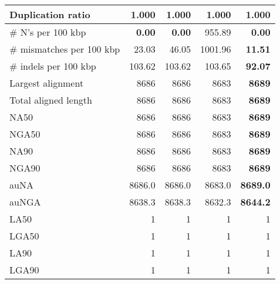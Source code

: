 \documentclass[12pt,a4paper]{article}
\begin{document}
\begin{table}[ht]
\begin{center}
\begin{tabular}{|l*{4}{|r}|}
Duplication ratio & 1.000 & 1.000 & 1.000 & 1.000 \\ \hline
\# N's per 100 kbp & {\bf 0.00} & {\bf 0.00} & 955.89 & {\bf 0.00} \\ \hline
\# mismatches per 100 kbp & 23.03 & 46.05 & 1001.96 & {\bf 11.51} \\ \hline
\# indels per 100 kbp & 103.62 & 103.62 & 103.65 & {\bf 92.07} \\ \hline
Largest alignment & 8686 & 8686 & 8683 & {\bf 8689} \\ \hline
Total aligned length & 8686 & 8686 & 8683 & {\bf 8689} \\ \hline
NA50 & 8686 & 8686 & 8683 & {\bf 8689} \\ \hline
NGA50 & 8686 & 8686 & 8683 & {\bf 8689} \\ \hline
NA90 & 8686 & 8686 & 8683 & {\bf 8689} \\ \hline
NGA90 & 8686 & 8686 & 8683 & {\bf 8689} \\ \hline
auNA & 8686.0 & 8686.0 & 8683.0 & {\bf 8689.0} \\ \hline
auNGA & 8638.3 & 8638.3 & 8632.3 & {\bf 8644.2} \\ \hline
LA50 & 1 & 1 & 1 & 1 \\ \hline
LGA50 & 1 & 1 & 1 & 1 \\ \hline
LA90 & 1 & 1 & 1 & 1 \\ \hline
LGA90 & 1 & 1 & 1 & 1 \\ \hline
\end{tabular}
\end{center}
\end{table}
\end{document}
